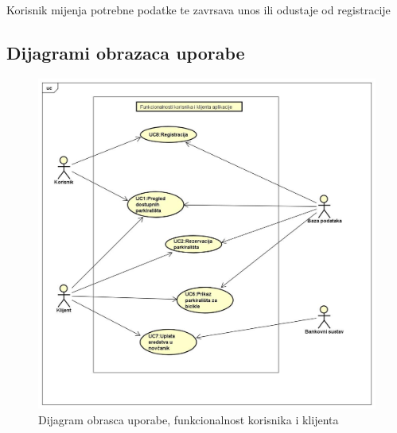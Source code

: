 {\begin{packed_item}
\begin{packed_item}
\begin{packed_enum}
			\item {Korisnik mijenja potrebne podatke te zavrsava unos ili odustaje od registracije}
		\end{packed_enum}
		
	\end{packed_item}
	
\end{packed_item}

\newpage

\subsection{Dijagrami obrazaca uporabe}



\begin{figure}[!htb]
	\centering
	\includegraphics[width=1\linewidth]{dijagrami/dijagramKlijent.jpg}
	\caption{ Dijagram obrasca uporabe, funkcionalnost korisnika i klijenta}
	\label{fig:dijagramklijent}
	
\end{figure}

}
